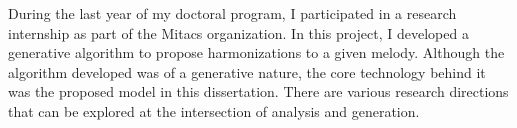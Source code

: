 
During the last year of my doctoral program, I participated
in a research internship as part of the Mitacs organization.
In this project, I developed a generative algorithm to
propose harmonizations to a given melody. Although the
algorithm developed was of a generative nature, the core
technology behind it was the proposed model in this
dissertation. There are various research directions that can
be explored at the intersection of analysis and generation. 
